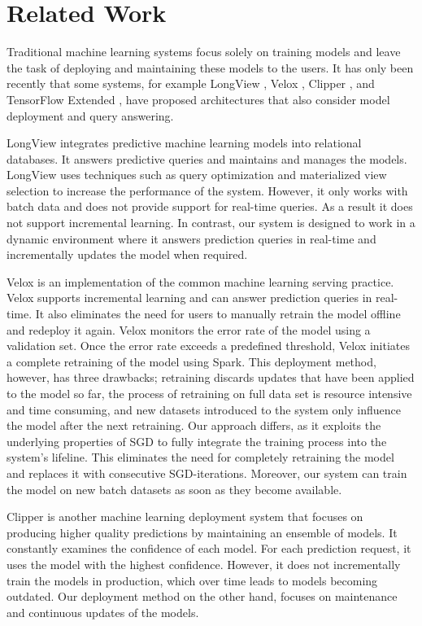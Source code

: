 \section{Related Work} \label{related-work}
Traditional machine learning systems focus solely on training models and leave the task of deploying and maintaining these models to the users.
It has only been recently that some systems, for example LongView \cite{akdere2011case}, Velox \cite{crankshaw2014missing}, Clipper \cite{crankshaw2016clipper} , and TensorFlow Extended \cite{baylor2017tfx}, have proposed architectures that also consider model deployment and query answering.

LongView integrates predictive machine learning models into relational databases. 
It answers predictive queries and maintains and manages the models.
LongView uses techniques such as query optimization and materialized view selection to increase the performance of the system.
However, it only works with batch data and does not provide support for real-time queries. 
As a result it does not support incremental learning.
In contrast, our system is designed to work in a dynamic environment where it answers prediction queries in real-time and incrementally updates the model when required.

Velox is an implementation of the common machine learning serving practice.
Velox supports incremental learning and can answer prediction queries in real-time.
It also eliminates the need for users to manually retrain the model offline and redeploy it again.
Velox monitors the error rate of the model using a validation set.
Once the error rate exceeds a predefined threshold, Velox initiates a complete retraining of the model using Spark. 
This deployment method, however, has three drawbacks; retraining discards updates that have been applied to the model so far, the process of retraining on full data set is resource intensive and time consuming, and new datasets introduced to the system only influence the model after the next retraining.
Our approach differs, as it exploits the underlying properties of SGD to fully integrate the training process into the system's lifeline.
This eliminates the need for completely retraining the model and replaces it with consecutive SGD-iterations.
Moreover, our system can train the model on new batch datasets as soon as they become available.

Clipper is another machine learning deployment system that focuses on producing higher quality predictions by maintaining an ensemble of models.
It constantly examines the confidence of each model.
For each prediction request, it uses the model with the highest confidence.
However, it does not incrementally train the models in production, which over time leads to models becoming outdated.
Our deployment method on the other hand, focuses on maintenance and continuous updates of the models.

